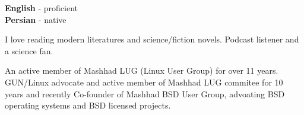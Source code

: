 \documentclass[12pt]{developercv}
\begin{document}

\begin{minipage}[t]{1.0\textwidth}
	\vspace{-\baselineskip} %


	\textbf{English} - proficient\\
	\textbf{Persian} - native\\
\end{minipage}
\hfill
\begin{minipage}[t]{1.0\textwidth}
	\vspace{-\baselineskip} %
	
	
	I love reading modern literatures and science/fiction novels. Podcast listener
	and a science fan.
	\\
\end{minipage}
\hfill
\begin{minipage}[t]{1.0\textwidth}
	\vspace{-\baselineskip} %
	
	
	An active member of Mashhad LUG (Linux User Group) for over 11 years.
	GUN/Linux advocate and active member of Mashhad LUG commitee
	for 10 years and recently Co-founder of Mashhad BSD User Group,
	advoating BSD operating systems and BSD licensed projects.

\end{minipage}

\end{document}

